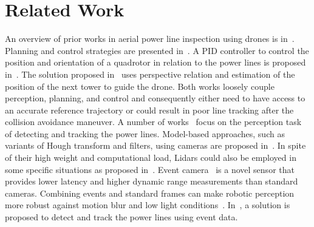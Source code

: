 \section{Related Work} 
An overview of prior works in aerial power line inspection using drones is in~\cite{jenssen2018automatic}. Planning and control strategies are presented in~\cite{takaya2019development,hui2017novel}. A PID controller to control the position and orientation of a quadrotor in relation to the power lines is proposed in~\cite{takaya2019development}. The solution proposed in~\cite{hui2017novel} uses perspective relation and estimation of the position of the next tower to guide the drone. Both works loosely couple perception, planning, and control and consequently either need to have access to an accurate reference trajectory or could result in poor line tracking after the collision avoidance maneuver. A number of works~\cite{nasseri2018power,tian2015power, gerke2014visual, azevedo2019lidar, dietsche2021powerline} focus on the perception task of detecting and tracking the power lines. Model-based approaches, such as variants of Hough transform and filters, using cameras are proposed in~\cite{nasseri2018power,tian2015power, gerke2014visual}. In spite of their high weight and computational load, Lidars could also be employed in some specific situations as proposed in~\cite{azevedo2019lidar}. Event camera~\cite{gallego2020event} is a novel sensor that provides lower latency and higher dynamic range measurements than standard cameras. Combining events and standard frames can make robotic perception more robust against motion blur and low light conditions~\cite{sun2021autonomous}. In~\cite{dietsche2021powerline}, a solution is proposed to detect and track the power lines using event data.


